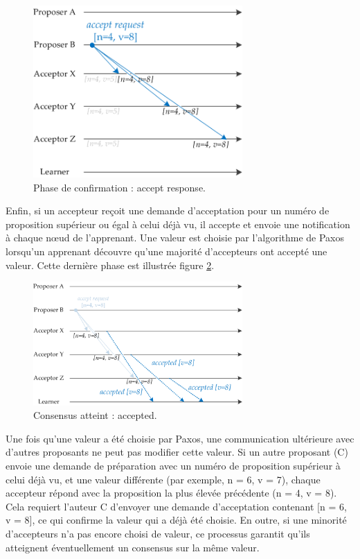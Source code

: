 \begin{figure}[H]
    \centering
    \includegraphics[width=8cm]{./images/paxos_ex4.png}
    \caption{Phase de confirmation : accept response.}
    \label{chap2:paxos_ex4}
\end{figure}

Enfin, si un accepteur reçoit une demande d'acceptation pour un numéro de proposition supérieur ou égal à celui déjà vu, il accepte et envoie une notification à chaque nœud de l'apprenant. Une valeur est choisie par l'algorithme de Paxos lorsqu'un apprenant découvre qu'une majorité d'accepteurs ont accepté une valeur. Cette dernière phase est illustrée figure \ref{chap2:paxos_ex5}.

\begin{figure}[H]
    \centering
    \includegraphics[width=8cm]{./images/paxos_ex5.png}
    \caption{Consensus atteint : accepted.}
    \label{chap2:paxos_ex5}
\end{figure}

Une fois qu'une valeur a été choisie par Paxos, une communication ultérieure avec d'autres proposants ne peut pas modifier cette valeur. Si un autre proposant (C) envoie une demande de préparation avec un numéro de proposition supérieur à celui déjà vu, et une valeur différente (par exemple, n = 6, v = 7), chaque accepteur répond avec la proposition la plus élevée précédente (n = 4, v = 8). Cela requiert l'auteur C d'envoyer une demande d'acceptation contenant [n = 6, v = 8], ce qui confirme la valeur qui a déjà été choisie. En outre, si une minorité d'accepteurs n'a pas encore choisi de valeur, ce processus garantit qu'ils atteignent éventuellement un consensus sur la même valeur.

